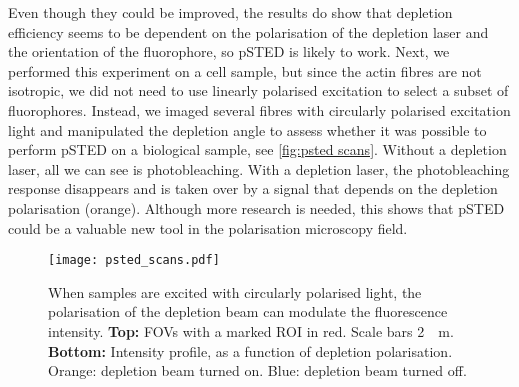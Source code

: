 Even though they could be improved, the results do show that depletion efficiency seems to be dependent on the polarisation of the depletion laser and the orientation of the fluorophore, so pSTED is likely to work. Next, we performed this experiment on a cell sample, but since the actin fibres are not isotropic, we did not need to use linearly polarised excitation to select a subset of fluorophores. Instead, we imaged several fibres with circularly polarised excitation light and manipulated the depletion angle to assess whether it was possible to perform pSTED on a biological sample, see \autoref{fig:psted scans}. Without a depletion laser, all we can see is photobleaching. With a depletion laser, the photobleaching response disappears and is taken over by a signal that depends on the depletion polarisation (orange). Although more research is needed, this shows that pSTED could be a valuable new tool in the polarisation microscopy field.

\begin{figure}
	\centering
	\texttt{[image: psted\_scans.pdf]}
	\caption{
		When samples are excited with circularly polarised light, the polarisation of the depletion beam can modulate the fluorescence intensity. \textbf{Top:} FOVs with a marked ROI in red. Scale bars \SI{2}{\mu m}. \textbf{Bottom:} Intensity profile, as a function of depletion polarisation. Orange: depletion beam turned on. Blue: depletion beam turned off. 
	}
	\label{fig:psted scans}
\end{figure}




























